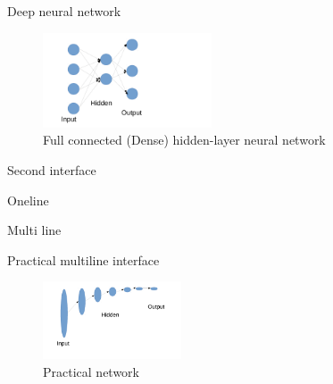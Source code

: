 \begin{frame}[plain]
  {Deep neural network}

  \begin{figure}
    \centering
    \includegraphics[width=5cm]{multi.pdf}
    \caption{Full connected (Dense) hidden-layer neural network}
  \end{figure}
  
\end{frame}

\begin{frame}[plain]
  {Second interface}

  
  Oneline

  
  Multi line
\end{frame}

\begin{frame}[plain]
  {Practical multiline interface}

  \begin{figure}
    \centering
    \includegraphics[height=2.3cm]{practical.pdf}
    \caption{Practical network}
  \end{figure}
  
\end{frame}
